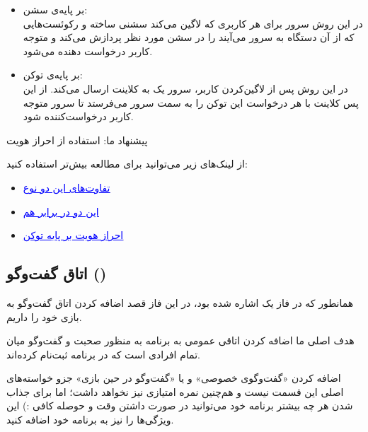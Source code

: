 \documentclass[]{article}
\begin{document}
\begin{itemize}
    \item بر پایه‌ی سشن: \\
    در این روش سرور برای هر کاربری که لاگین می‌کند سشنی ساخته و رکوئست‌هایی که از آن دستگاه به سرور می‌آیند را در سشن مورد نظر پردازش می‌کند و متوجه کاربر درخواست دهنده می‌شود.
    \item بر پایه‌ی توکن: \\
    در این روش پس از لاگین‌کردن کاربر، سرور یک  به کلاینت ارسال می‌کند. از این پس کلاینت با هر درخواست این توکن را به سمت سرور می‌فرستد تا سرور متوجه کاربر درخواست‌کننده شود.
\end{itemize}

پیشنهاد ما: استفاده از احراز هویت 

از لینک‌های زیر می‌توانید برای مطالعه بیش‌تر استفاده کنید:

\begin{itemize}
    \item \href{https://dev.to/thecodearcher/what-really-is-the-difference-between-session-and-token-based-authentication-2o39}{\textcolor{blue}{\underline{تفاوت‌های این دو نوع}}}
    \item \href{https://sherryhsu.medium.com/session-vs-token-based-authentication-11a6c5ac45e4}{\textcolor{blue}{\underline{این دو در برابر هم}}}
    \item \href{https://www.okta.com/identity-101/what-is-token-based-authentication/}{\textcolor{blue}{\underline{احراز هویت بر پایه توکن}}}
\end{itemize}

\subsection*{{\titr اتاق گفت‌وگو ()}}

همانطور که در فاز یک اشاره شده بود، در این فاز قصد اضافه کردن اتاق گفت‌وگو به بازی خود را داریم.

هدف اصلی ما اضافه کردن اتاقی عمومی به برنامه به منظور صحبت و گفت‌وگو میان تمام افرادی است که در برنامه ثبت‌نام کرده‌اند.

\begin{tcolorbox}[colback=green!5!white,colframe=green!75!black,title=\textbf{نکته}]
    اضافه کردن «گفت‌و‌گوی خصوصی» و یا «گفت‌وگو در حین بازی» جزو خواسته‌های اصلی این قسمت نیست و هم‌چنین نمره امتیازی نیز نخواهد داشت؛ اما برای جذاب شدن هر چه بیشتر برنامه خود می‌توانید در صورت داشتن وقت و حوصله کافی :) این ویژگی‌ها را نیز به برنامه خود اضافه کنید.
\end{tcolorbox}
\end{document}
